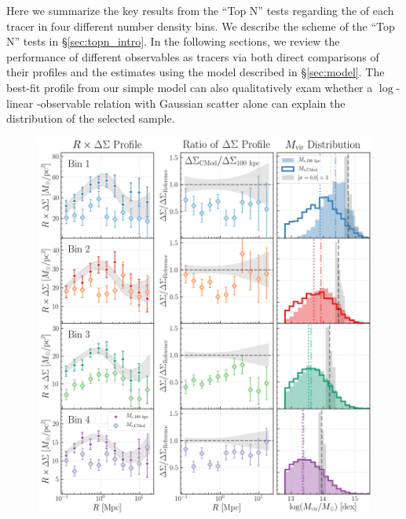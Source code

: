 \documentclass[a4paper,fleqn,usenatbib]{mnras}
\begin{document}
    Here we summarize the key results from the ``Top N'' tests regarding the \sighalo{} of 
    each \mvir{} tracer in four different number density bins.
    We describe the scheme of the ``Top N'' tests in \S \ref{sec:topn_intro}. 
    In the following sections, we review the performance of different observables as \mvir{}
    tracers via both direct comparisons of their \dsigma{} profiles and the \sighalo{}
    estimates using the model described in \S \ref{sec:model}.
    The best-fit \dsigma{} profile from our simple model can also qualitatively exam whether 
    a $\log$-linear \mvir{}-observable relation with Gaussian scatter alone can explain the 
    \mvir{} distribution of the selected sample.

  \begin{figure}
      \centering 
      \includegraphics[width=\textwidth]{figure/topn_dsigma_m100_cmod_compare}
      \caption{
          }
      \label{fig:m100_cmod}
  \end{figure}
\end{document}

